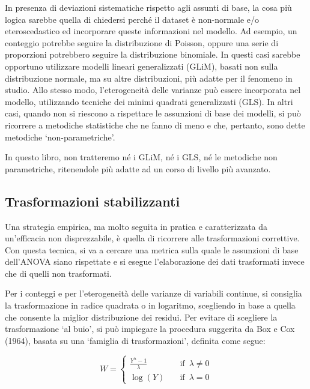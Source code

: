 \documentclass[a4paper,12pt,oneside]{book}
\begin{document}
In presenza di deviazioni sistematiche rispetto agli assunti di base, la cosa più logica sarebbe quella di chiedersi perché il dataset è non-normale e/o eteroscedastico ed incorporare queste informazioni nel modello. Ad esempio, un conteggio potrebbe seguire la distribuzione di Poisson, oppure una serie di proporzioni potrebbero seguire la distribuzione binomiale. In questi casi sarebbe opportuno utilizzare modelli lineari generalizzati (GLiM), basati non sulla distribuzione normale, ma su altre distribuzioni, più adatte per il fenomeno in studio. Allo stesso modo, l'eterogeneità delle varianze può essere incorporata nel modello, utilizzando tecniche dei minimi quadrati generalizzati (GLS). In altri casi, quando non si riescono a rispettare le assunzioni di base dei modelli, si può ricorrere a metodiche statistiche che ne fanno di meno e che, pertanto, sono dette metodiche `non-parametriche'.

In questo libro, non tratteremo né i GLiM, né i GLS, né le metodiche non parametriche, ritenendole più adatte ad un corso di livello più avanzato.

\hypertarget{trasformazioni-stabilizzanti}{%
\subsection{Trasformazioni stabilizzanti}\label{trasformazioni-stabilizzanti}}

Una strategia empirica, ma molto seguita in pratica e caratterizzata da un'efficacia non disprezzabile, è quella di ricorrere alle trasformazioni correttive. Con questa tecnica, si va a cercare una metrica sulla quale le assunzioni di base dell'ANOVA siano rispettate e si esegue l'elaborazione dei dati trasformati invece che di quelli non trasformati.

Per i conteggi e per l'eterogeneità delle varianze di variabili continue, si consiglia la trasformazione in radice quadrata o in logaritmo, scegliendo in base a quella che consente la miglior distribuzione dei residui. Per evitare di scegliere la trasformazione `al buio', si può impiegare la procedura suggerita da Box e Cox (1964), basata su una `famiglia di trasformazioni', definita come segue:

\[ W = \left\{ \begin{array}{ll}
\frac{Y^\lambda - 1}{\lambda} & \quad \textrm{if} \,\,\, \lambda \neq 0 \\
\log(Y) & \quad \textrm{if} \,\,\, \lambda = 0
\end{array} \right.\]
\end{document}

